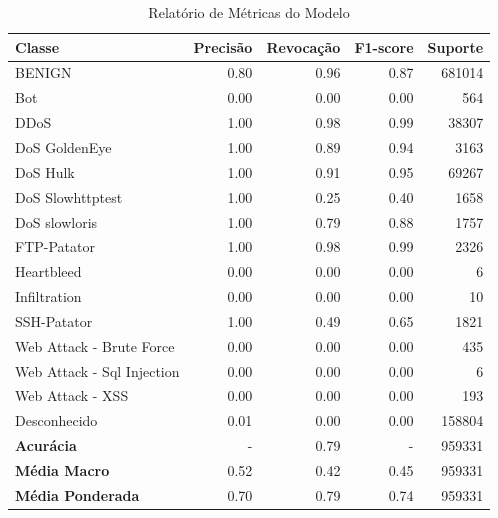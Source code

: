 \begin{table}[H]
    \centering
    \small
    \begin{tabular}{lrrrr}
        \hline
        Classe                     & Precisão & Revocação & F1-score & Suporte \\
        \hline
        BENIGN                     & 0.80     & 0.96      & 0.87     & 681014  \\
        Bot                        & 0.00     & 0.00      & 0.00     & 564     \\
        DDoS                       & 1.00     & 0.98      & 0.99     & 38307   \\
        DoS GoldenEye              & 1.00     & 0.89      & 0.94     & 3163    \\
        DoS Hulk                   & 1.00     & 0.91      & 0.95     & 69267   \\
        DoS Slowhttptest           & 1.00     & 0.25      & 0.40     & 1658    \\
        DoS slowloris              & 1.00     & 0.79      & 0.88     & 1757    \\
        FTP-Patator                & 1.00     & 0.98      & 0.99     & 2326    \\
        Heartbleed                 & 0.00     & 0.00      & 0.00     & 6       \\
        Infiltration               & 0.00     & 0.00      & 0.00     & 10      \\
        SSH-Patator                & 1.00     & 0.49      & 0.65     & 1821    \\
        Web Attack - Brute Force   & 0.00     & 0.00      & 0.00     & 435     \\
        Web Attack - Sql Injection & 0.00     & 0.00      & 0.00     & 6       \\
        Web Attack - XSS           & 0.00     & 0.00      & 0.00     & 193     \\
        Desconhecido               & 0.01     & 0.00      & 0.00     & 158804  \\
        \hline
        \textbf{Acurácia}          & -        & 0.79      & -        & 959331  \\
        \textbf{Média Macro}       & 0.52     & 0.42      & 0.45     & 959331  \\
        \textbf{Média Ponderada}   & 0.70     & 0.79      & 0.74     & 959331  \\
        \hline
    \end{tabular}
    \caption{Relatório de Métricas do Modelo}
    \label{table:dnn_Sem_PortScan_metricas}
\end{table}